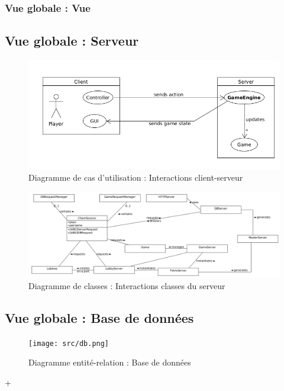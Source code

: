 \documentclass{report}
\begin{document}
\subsubsection{Vue globale : Vue}

\subsection{Vue globale : Serveur}

\vspace{-1em}

\begin{figure}[H]
    \centering
    \includegraphics[width=\textwidth, keepaspectratio]{src/server.png}
    \caption{Diagramme de cas d’utilisation : Interactions client-serveur}
    \label{fig:use_case_server}
\end{figure}

\vspace{-1em}

\begin{figure}[H]
    \centering
    \includegraphics[width=\textwidth, keepaspectratio]{src/server_class.png}
    \caption{Diagramme de classes : Interactions classes du serveur}
    \label{fig:classes_server}
\end{figure}

\subsection{Vue globale : Base de données}

\vspace{-1em}

\begin{figure}[H]
    \centering
    \texttt{[image: src/db.png]}
    \caption{Diagramme entité-relation : Base de données}
    \label{fig:entity_relation_database}
\end{figure}
+
\end{document}
